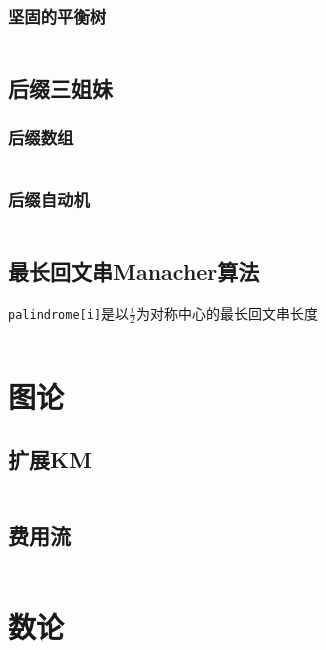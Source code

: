 \documentclass[a4paper]{article}
\newcommand{\cppcode}[1]{
    \inputminted[mathescape]{cpp}{source/#1}
}
\begin{document}
\cppcode{persistent-segment-tree.cpp}

\subsubsection{坚固的平衡树}

\cppcode{persistent-treap.cpp}

\subsection{后缀三姐妹}

\subsubsection{后缀数组}

\cppcode{suffix-array.cpp}

\subsubsection{后缀自动机}

\cppcode{suffix-automaton.cpp}

\subsection{最长回文串Manacher算法}

\texttt{palindrome[i]}是以$\frac{i}{2}$为对称中心的最长回文串长度

\cppcode{manacher.cpp}

\section{图论}

\subsection{扩展KM}

\cppcode{lq-extended-km.cpp}

\subsection{费用流}

\cppcode{lwh-zkw-flow.cpp}

\section{数论}
\end{document}
